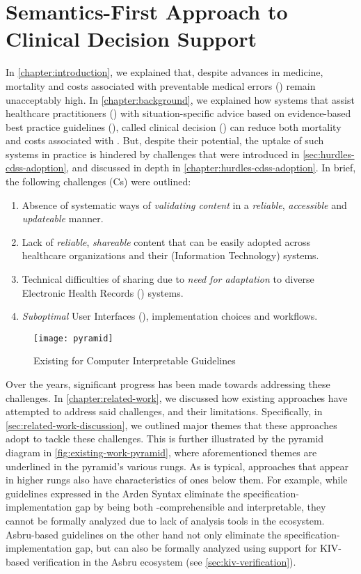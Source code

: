 \chapter{Semantics-First Approach to Clinical Decision Support}

In \autoref{chapter:introduction}, we explained that, despite
advances in medicine, mortality and costs associated with preventable
medical errors (\PMEs{}) remain unacceptably high. In
\autoref{chapter:background}, we explained how systems that
assist healthcare practitioners (\HCPs{}) with situation-specific
advice based on evidence-based best practice guidelines (\BPGs{}),
called clinical decision (\CDSSs{}) can reduce both mortality
and costs associated with \PMEs{}. But, despite their potential,
the uptake of such systems in practice is hindered by challenges
that were introduced in \autoref{sec:hurdles-cdss-adoption}, and
discussed in depth in \autoref{chapter:hurdles-cdss-adoption}.
In brief, the following challenges (Cs) were outlined:
\begin{enumerate}[label=C\arabic*.]
\itemsep0.0em
\item Absence of systematic ways of \emph{validating content}
in a \emph{reliable}, \emph{accessible} and \emph{updateable} manner.
\item Lack of \emph{reliable}, \emph{shareable} \CDSS{} content
that can be easily adopted across healthcare organizations and their (Information
Technology) \IT{} systems.
\item Technical difficulties of sharing due to \emph{need for
  adaptation} to diverse Electronic Health Records (\EHR) systems.
\item \emph{Suboptimal} User Interfaces (\UIs), implementation choices and
workflows.
\end{enumerate}

\begin{figure}[th!]
  \centering
  \texttt{[image: pyramid]}
  \caption{Existing \DSLs{} for Computer Interpretable Guidelines}\label{fig:existing-work-pyramid}
\end{figure}

Over the years, significant progress has been made towards
addressing these challenges. In \autoref{chapter:related-work},
we discussed how existing approaches have attempted to
address said challenges, and their limitations. Specifically,
in \autoref{sec:related-work-discussion}, we outlined major
themes that these approaches adopt to tackle these challenges.
This is further illustrated by the pyramid diagram in \autoref{fig:existing-work-pyramid}, where aforementioned themes are
underlined in the pyramid's various rungs.
As is typical, approaches that appear in higher rungs also
have characteristics of ones below them. For example, while guidelines expressed in
the Arden Syntax eliminate the specification-implementation gap by being
both \HCP{}-comprehensible and interpretable, they cannot be formally analyzed
due to lack of analysis tools in the ecosystem. Asbru-based guidelines
on the other hand not only eliminate the specification-implementation gap, but can also be
formally analyzed using support for KIV-based verification in the Asbru
ecosystem (see \autoref{sec:kiv-verification}).

